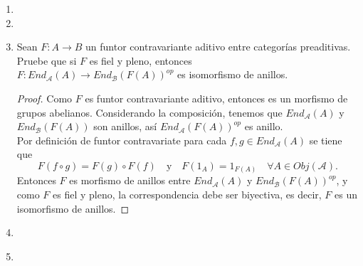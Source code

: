 \documentclass{article}
\begin{document}
\begin{enumerate}[label=\textbf{Ej \arabic*.}]
en $Mod(R)\backslash A$\quad $\iff$ \quad 
{}
en $Mod(R)$.

\begin{proof}
en $Mod(R)\backslash A$\\
 $\iff \exists g^{-1}\colon f\longrightarrow f$ tal que $g^{-1}g=1_f$ y $gg^{-1}=1_f$\\
 $\iff \exists g^{-1}\colon f\longrightarrow f$ tal que $g^{-1}g=Id_B$ y $gg^{-1}=Id_B$\\
 $\iff \exists g^{-1}\in \operatorname{Hom}_R(B,B)$ tal que $g^{-1}g=Id_B$, $gg^{-1}=Id_B$ y $f=g^{-1}f$\\
$\iff$ 
es isomorfismo en $Mod(R)$ tal que $gf=f$.
\end{proof}
\item
\item
\item Sean $F\colon A\longrightarrow B$ un funtor contravariante aditivo entre categorías preaditivas. Pruebe que si $F$ es fiel y pleno, entonces\\
$F\colon End_\mathcal{A}(A) \longrightarrow End_\mathcal{B} (F(A))^{op}$ es isomorfismo de anillos.
\begin{proof}
Como $F$ es funtor contravariante aditivo, entonces es un morfismo de grupos abelianos. Considerando la composición, tenemos que 
$End_ \mathcal{A}(A)$ y $End_\mathcal{B}(F(A))$ son anillos, así $End_\mathcal{A}(F(A))^{op}$ es anillo.\\

Por definición de funtor contravariate para cada $f,g\in End_ \mathcal{A}(A)$ se tiene que 
\[F(f\circ g)=F(g)\circ F(f)\quad \text{y}\quad F(1_A)=1_{F(A)}\quad \forall A\in Obj(\mathcal{A}).
\]
Entonces $F$ es morfismo de anillos entre $End_\mathcal{A}(A)$ y $End_\mathcal{B}(F(A))^{op}$, y como $F$ es fiel y pleno, la correspondencia debe ser
biyectiva, es decir, $F$ es un isomorfismo de anillos.
\end{proof}

\item
\item \,\\ \,


\end{enumerate}
\end{document}
